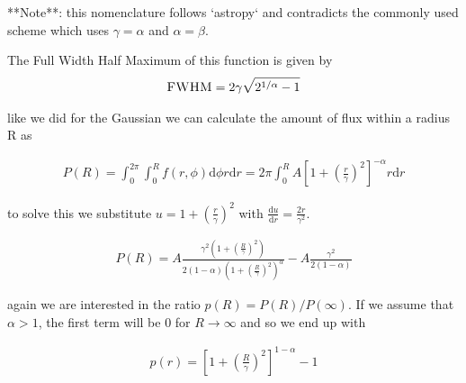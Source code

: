 **Note**: this nomenclature follows `astropy` and contradicts the commonly used scheme which uses $\gamma=\alpha$ and $\alpha=\beta$.

The Full Width Half Maximum of this function is given by
\begin{align}
\textsc{FWHM} = 2\gamma \sqrt{2^{1/\alpha}-1}
\end{align}


like we did for the Gaussian we can calculate the amount of flux within a radius R as 

\begin{align}
P(R) = \int_0^{2\pi} \int_0^R f(r,\phi) \mathrm{d} \phi r \mathrm{d} r = 2\pi \int_0^R A \left[1 + \left(\frac{r}{\gamma}\right)^2 \right]^{- \alpha} r \mathrm{d} r
\end{align}


to solve this we substitute $u=1+\left(\frac{r}{\gamma} \right)^2 $ with $\frac{\mathrm{d} u}{\mathrm{d} r} = \frac{2r}{\gamma^2}$. 


\begin{align}
P(R) = A \frac{\gamma^2 \left(1 + \left( \frac{R}{\gamma} \right)^2 \right)}{2(1-\alpha)\left( 1+\left( \frac{R}{\gamma}\right)^2\right)^\alpha} - A\frac{\gamma^2}{2(1-\alpha)}
\end{align}


again we are interested in the ratio $p(R) = P(R) / P(\infty)$. If we assume that $\alpha>1$, the first term will be $0$ for $R\rightarrow \infty$ and so we end up with 

\begin{align}
p(r) = \left[ 1+\left( \frac{R}{\gamma}\right)^2\right]^{1-\alpha} - 1
\end{align}

